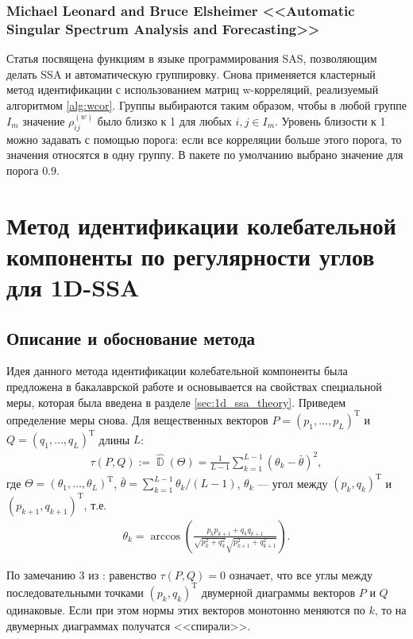 \documentclass[specialist,
               substylefile = spbu.rtx,
               subf,href,colorlinks=true, 12pt]{disser}
\DeclareMathOperator{\D}{\mathbb{D}}
\begin{document}
\subsection{Michael Leonard and Bruce Elsheimer <<Automatic Singular Spectrum Analysis and Forecasting>>
 \cite{Leonard2017}}

Статья посвящена функциям в языке программирования SAS, позволяющим делать SSA и автоматическую группировку. Снова применяется кластерный метод идентификации  с использованием матриц w-корреляций, реализуемый алгоритмом \ref{alg:wcor}. Группы выбираются таким образом, чтобы в любой группе $I_m$ значение $\rho^{(w)} _{ij}$ было близко к 1 для любых $i, j \in I_m$. Уровень близости к 1 можно задавать с помощью порога: если все корреляции больше этого порога, то значения относятся в одну группу. В пакете по умолчанию выбрано значение для порога $0.9$.

\chapter{Метод идентификации колебательной компоненты по регулярности углов для 1D-SSA}
\label{sec:tau1}
\section{Описание и обоснование метода}
Идея данного метода идентификации колебательной компоненты была предложена в бакалаврской работе \cite{Zhornikova2016} и основывается на свойствах специальной меры, которая была введена в разделе \ref{sec:1d_ssa_theory}.
Приведем определение меры снова.
Для вещественных векторов $P = (p_1,\ldots,p_L)^{\mathrm{T}}$ и $Q=(q_1,\ldots,q_L)^{\mathrm{T}}$ длины $L$: 
\begin{gather*} 
\tau(P, Q) := \hat{\D}(\Theta) =\frac{1}{L-1}\sum_{k=1}^{L-1}{\left(\theta_k  - \bar{\theta}\right)^2},
\end{gather*}
где $\Theta=(\theta_1,\ldots,\theta_L)^{\mathrm{T}}$,
$\bar{\theta} = \sum_{k=1}^{L-1}{\theta_k}/(L-1)$, $\theta_k$ --- угол между  
$\left(p_k, q_{k}\right)^{\mathrm{T}}$ и $\left(p_{k+1}, q_{k+1}\right)^{\mathrm{T}}$, т.е.
\begin{gather*}
\theta_k = \arccos{\left(\frac{p_{k} p_{k+1} + q_{k} q_{k+1}}{\sqrt{p_{k}^2+q_{k}^2}\sqrt{p_{k+1}^2+q_{k+1}^2}}\right)}.
\end{gather*}

По замечанию 3 из  \cite{Zhornikova2016}:
равенство $\tau(P, Q) =0$ означает, что все углы между последовательными точками $(p_k, q_k)^{\mathrm{T}}$ двумерной диаграммы векторов $P$ и $Q$ одинаковые. Если при этом нормы этих векторов монотонно меняются по $k$, то на двумерных диаграммах получатся <<спирали>>.
\end{document}
